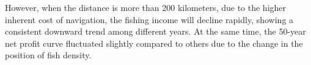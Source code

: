 \documentclass{mcmthesis}
\begin{document}
However, when the distance is more than 200 kilometers, due to the higher inherent cost of navigation, the fishing income will decline rapidly, showing a consistent downward trend among different years. At the same time, the 50-year net profit  curve fluctuated slightly compared to others due to the change in the position of fish density.

  \begin{figure}[h]
    \centering



\end{figure}
\end{document}
